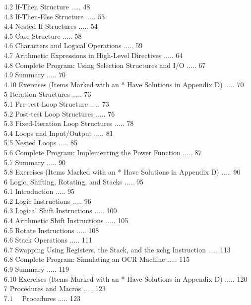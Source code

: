 \documentclass[10pt]{article}
\begin{document}
4.2 If-Then Structure ..... 48\\
4.3 If-Then-Else Structure ..... 53\\
4.4 Nested If Structures ..... 54\\
4.5 Case Structure ..... 58\\
4.6 Characters and Logical Operations ..... 59\\
4.7 Arithmetic Expressions in High-Level Directives ..... 64\\
4.8 Complete Program: Using Selection Structures and I/O ..... 67\\
4.9 Summary ..... 70\\
4.10 Exercises (Items Marked with an * Have Solutions in Appendix D) ..... 70\\
5 Iteration Structures ..... 73\\
5.1 Pre-test Loop Structure ..... 73\\
5.2 Post-test Loop Structures ..... 76\\
5.3 Fixed-Iteration Loop Structures ..... 78\\
5.4 Loops and Input/Output ..... 81\\
5.5 Nested Loops ..... 85\\
5.6 Complete Program: Implementing the Power Function ..... 87\\
5.7 Summary ..... 90\\
5.8 Exercises (Items Marked with an * Have Solutions in Appendix D) ..... 90\\
6 Logic, Shifting, Rotating, and Stacks ..... 95\\
6.1 Introduction ..... 95\\
6.2 Logic Instructions ..... 96\\
6.3 Logical Shift Instructions ..... 100\\
6.4 Arithmetic Shift Instructions ..... 105\\
6.5 Rotate Instructions ..... 108\\
6.6 Stack Operations ..... 111\\
6.7 Swapping Using Registers, the Stack, and the xchg Instruction ..... 113\\
6.8 Complete Program: Simulating an OCR Machine ..... 115\\
6.9 Summary ..... 119\\
6.10 Exercises (Items Marked with an * Have Solutions in Appendix D) ..... 120\\
7 Procedures and Macros ..... 123\\
$7.1 \quad$ Procedures ..... 123\\
\end{document}
